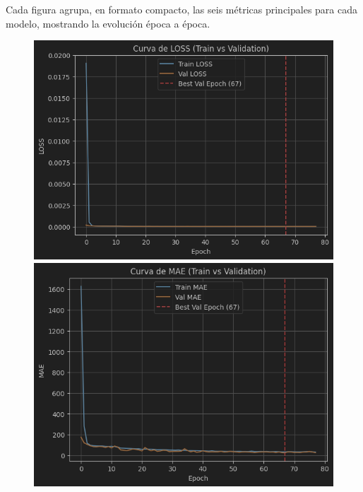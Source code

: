 Cada figura agrupa, en formato compacto, las seis métricas principales para cada modelo, mostrando la evolución época a época.

\begin{figure}[H]
	\centering
	\begin{minipage}{0.48\textwidth}
		\centering
		\includegraphics[width=\linewidth]{includes/cap5/graphs/sid1_mlp_loss.png}
		\vspace{0.2cm}
		\includegraphics[width=\linewidth]{includes/cap5/graphs/sid1_mlp_mae.png}
		\vspace{0.2cm}

\end{minipage}
\end{figure}
